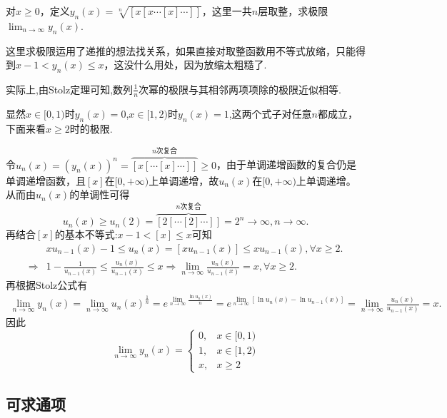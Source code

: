 \documentclass[../../main.tex]{subfiles}
\begin{document}
\begin{example}
对\(x\geqslant 0\)，定义\(y_n(x)=\sqrt[n]{[x[x\cdots[x]\cdots]]}\)，这里一共\(n\)层取整，求极限\(\lim_{n\rightarrow\infty}y_n(x)\).
\end{example}
\begin{note}
这里求极限运用了递推的想法找关系，如果直接对取整函数用不等式放缩，只能得到\(x - 1<y_n(x)\leqslant  x\)，这没什么用处，因为放缩太粗糙了.

实际上,由Stolz定理可知,数列$\frac{1}{n}$次幂的极限与其相邻两项项除的极限近似相等.
\end{note}
\begin{solution}
显然\(x\in[0,1)\)时\(y_n(x)=0\),\(x\in[1,2)\)时\(y_n(x)=1\),这两个式子对任意\(n\)都成立，下面来看\(x\geqslant 2\)时的极限.

令\(u_n(x) = (y_n(x))^n=\overbrace{[x[\cdots [x]\cdots ]]}^{n\text{次复合}}\geqslant 0\)，由于单调递增函数的复合仍是单调递增函数，且\([x]\)在\([0, +\infty)\)上单调递增，故\(u_n(x)\)在\([0, +\infty)\)上单调递增。
从而由\(u_n(x)\)的单调性可得
\[
u_n(x) \geqslant u_n(2)=\overbrace{[2[\cdots [2]\cdots ]]}^{n\text{次复合}} = 2^n\rightarrow \infty, n\rightarrow \infty.
\]
再结合\([x]\)的基本不等式:$x-1<\left[ x \right] \leqslant x$可知
\begin{align*}
&xu_{n-1}(x)-1\le u_n(x)=[xu_{n-1}(x)]\le xu_{n-1}(x),\forall x\ge 2.
\\
\Rightarrow &1-\frac{1}{u_{n-1}(x)}\le \frac{u_n(x)}{u_{n-1}(x)}\le x\Rightarrow \lim_{n\rightarrow \infty} \frac{u_n(x)}{u_{n-1}(x)}=x,\forall x\ge 2.
\end{align*}
再根据Stolz公式有
\begin{align*}
\lim_{n\rightarrow \infty} y_n(x)=\lim_{n\rightarrow \infty} u_n(x)^{\frac{1}{n}}=e^{\lim\limits_{n\rightarrow \infty} \frac{\ln u_n(x)}{n}}=e^{\lim\limits_{n\rightarrow \infty} [\ln u_n(x)-\ln u_{n-1}(x)]}=\lim_{n\rightarrow \infty} \frac{u_n(x)}{u_{n-1}(x)}=x.
\end{align*}
因此
\[ 
\lim_{n\rightarrow\infty}y_n(x)=
\begin{cases}
0, & x\in[0,1)\\
1, & x\in[1,2)\\
x, & x\geqslant 2
\end{cases}
\]
\end{solution}


\subsection{可求通项}
\end{document}
